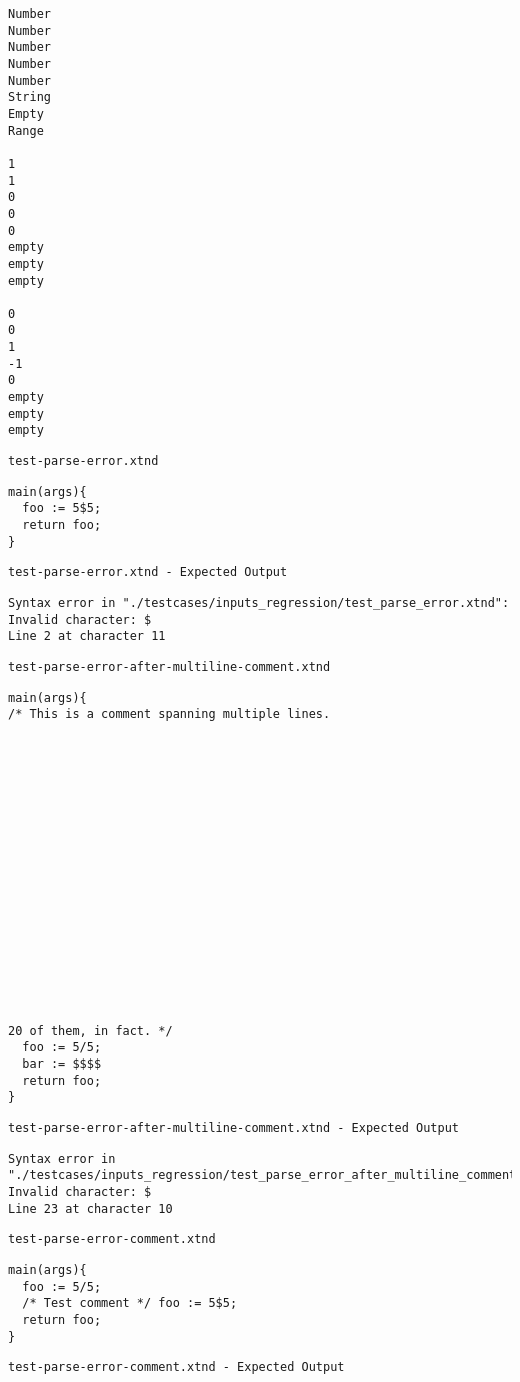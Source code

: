 \begin{lstlisting}
Number
Number
Number
Number
Number
String
Empty
Range

1
1
0
0
0
empty
empty
empty

0
0
1
-1
0
empty
empty
empty
\end{lstlisting}


\medskip \noindent \texttt{test-parse-error.xtnd}


\begin{lstlisting}
main(args){
  foo := 5$5;
  return foo;
}
\end{lstlisting}


\medskip \noindent \texttt{test-parse-error.xtnd - Expected Output}


\begin{lstlisting}
Syntax error in "./testcases/inputs_regression/test_parse_error.xtnd": Invalid character: $
Line 2 at character 11
\end{lstlisting}


\medskip \noindent \texttt{test-parse-error-after-multiline-comment.xtnd}


\begin{lstlisting}
main(args){
/* This is a comment spanning multiple lines.


















20 of them, in fact. */
  foo := 5/5;
  bar := $$$$
  return foo;
}
\end{lstlisting}


\medskip \noindent \texttt{test-parse-error-after-multiline-comment.xtnd - Expected Output}


\begin{lstlisting}
Syntax error in "./testcases/inputs_regression/test_parse_error_after_multiline_comment.xtnd": Invalid character: $
Line 23 at character 10
\end{lstlisting}


\medskip \noindent \texttt{test-parse-error-comment.xtnd}


\begin{lstlisting}
main(args){
  foo := 5/5;
  /* Test comment */ foo := 5$5;
  return foo;
}
\end{lstlisting}


\medskip \noindent \texttt{test-parse-error-comment.xtnd - Expected Output}


